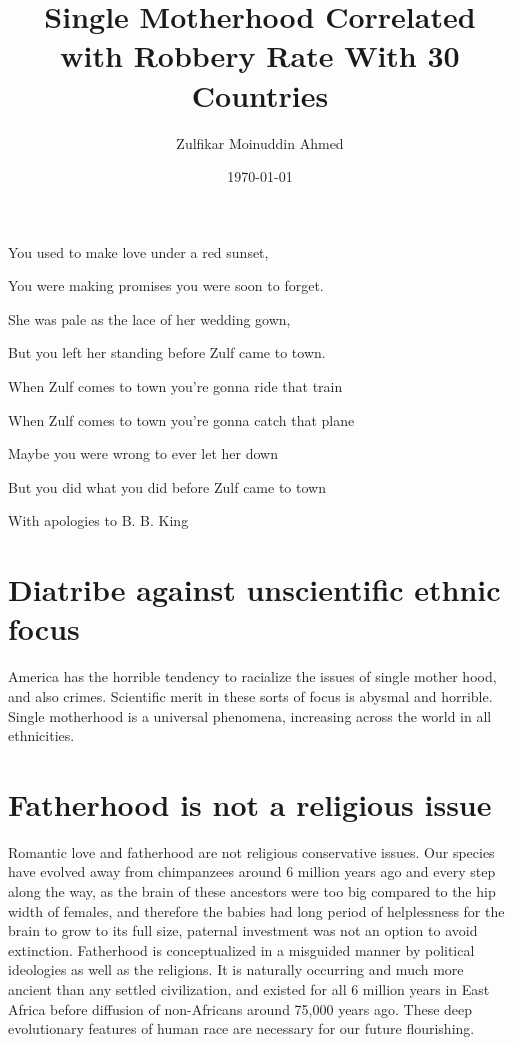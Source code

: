 \documentclass{amsart}
\title{Single Motherhood Correlated with Robbery Rate With 30 Countries}
\author{Zulfikar Moinuddin Ahmed}
\date{\today}
\begin{document}
\maketitle

\epigraph{
You used to make love under a red sunset,

You were making promises you were soon to forget.

She was pale as the lace of her wedding gown,

But you left her standing before Zulf came to town.

When Zulf comes to town you're gonna ride that train

When Zulf comes to town you're gonna catch that plane

Maybe you were wrong to ever let her down

But you did what you did before Zulf came to town
}{ With apologies to B. B. King}

\section{Diatribe against unscientific ethnic focus}

America has the horrible tendency to racialize the issues of single mother hood, and also crimes.  Scientific merit in these sorts of focus is abysmal and horrible. Single motherhood is a universal phenomena, increasing across the world in all ethnicities.

\section{Fatherhood is not a religious issue}

Romantic love and fatherhood are not religious conservative issues.  Our species have evolved away from chimpanzees around 6 million years ago and every step along the way, as the brain of these ancestors were too big compared to the hip width of females, and therefore the babies had long period of helplessness for the brain to grow to its full size, paternal investment was not an option to avoid extinction.  Fatherhood is conceptualized in a misguided manner by political ideologies as well as the religions.  It is naturally occurring and much more ancient than any settled civilization, and existed for all 6 million years in East Africa before diffusion of non-Africans around 75,000 years ago.  These deep evolutionary features of human race are necessary for our future flourishing.
\end{document}
